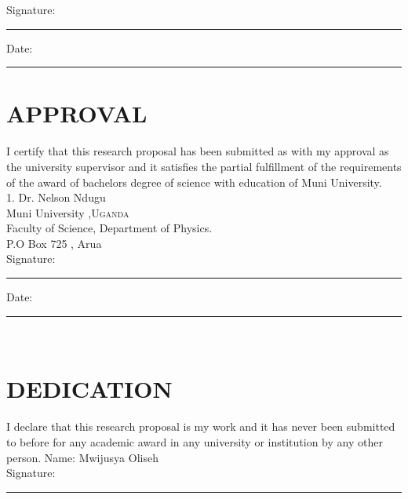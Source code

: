 \documentclass[12pt, a4paper, oneside]{thesis}
\begin{document}
Signature:\\
\rule[1em]{25em}{0.5pt} %
 
Date:\\
\rule[1em]{25em}{0.5pt} %





\clearpage %
\section*{APPROVAL}

 I certify that this research proposal has been submitted as with my approval as the university supervisor and it satisfies the partial fulfillment  of the requirements of the award of bachelors degree of science with education of Muni University. \\

1. Dr. Nelson Ndugu \\
   Muni University ,\textsc{Uganda}\\
  Faculty of Science, Department of Physics.\\P.O Box 725 , Arua\\
  Signature:\\
\rule[1em]{25em}{0.5pt} %

Date:\\
\rule[1em]{25em}{0.5pt} \\%

\clearpage 
\vspace{7cm}

\section*{DEDICATION}

I declare that this research proposal is my work and it has never been submitted to before for any academic award in any university or institution by any other person.
\vspace{1cm}
Name:   Mwijusya Oliseh\\

Signature:\\
\rule[1em]{25em}{0.5pt} %
 
\end{document}
